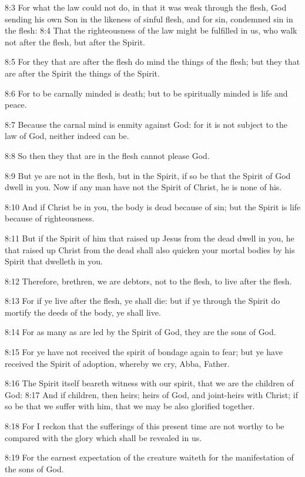 8:3 For what the law could not do, in that it was weak through the
flesh, God sending his own Son in the likeness of sinful flesh, and
for sin, condemned sin in the flesh: 8:4 That the righteousness of the
law might be fulfilled in us, who walk not after the flesh, but after
the Spirit.

8:5 For they that are after the flesh do mind the things of the flesh;
but they that are after the Spirit the things of the Spirit.

8:6 For to be carnally minded is death; but to be spiritually minded
is life and peace.

8:7 Because the carnal mind is enmity against God: for it is not
subject to the law of God, neither indeed can be.

8:8 So then they that are in the flesh cannot please God.

8:9 But ye are not in the flesh, but in the Spirit, if so be that the
Spirit of God dwell in you. Now if any man have not the Spirit of
Christ, he is none of his.

8:10 And if Christ be in you, the body is dead because of sin; but the
Spirit is life because of righteousness.

8:11 But if the Spirit of him that raised up Jesus from the dead dwell
in you, he that raised up Christ from the dead shall also quicken your
mortal bodies by his Spirit that dwelleth in you.

8:12 Therefore, brethren, we are debtors, not to the flesh, to live
after the flesh.

8:13 For if ye live after the flesh, ye shall die: but if ye through
the Spirit do mortify the deeds of the body, ye shall live.

8:14 For as many as are led by the Spirit of God, they are the sons of
God.

8:15 For ye have not received the spirit of bondage again to fear; but
ye have received the Spirit of adoption, whereby we cry, Abba, Father.

8:16 The Spirit itself beareth witness with our spirit, that we are
the children of God: 8:17 And if children, then heirs; heirs of God,
and joint-heirs with Christ; if so be that we suffer with him, that we
may be also glorified together.

8:18 For I reckon that the sufferings of this present time are not
worthy to be compared with the glory which shall be revealed in us.

8:19 For the earnest expectation of the creature waiteth for the
manifestation of the sons of God.

